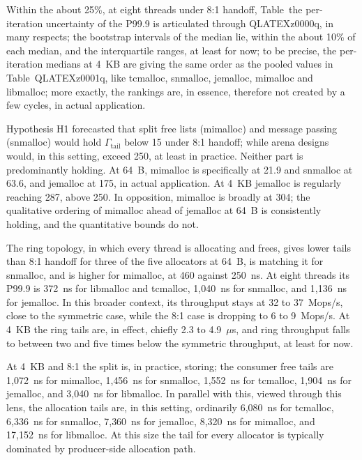 Within the about 25\%, at eight threads under 8:1 handoff, Table~the per-iteration uncertainty of the P99.9 is articulated through QLATEXz0000q, in many respects; the bootstrap intervals of the median lie, within the about 10\% of each median, and the interquartile ranges, at least for now; to be precise, the per-iteration medians at 4~KB are giving the same order as the pooled values in Table~QLATEXz0001q, like tcmalloc, snmalloc, jemalloc, mimalloc and libmalloc; more exactly, the rankings are, in essence, therefore not created by a few cycles, in actual application.









Hypothesis H1 forecasted that split free lists (mimalloc) and message passing (snmalloc) would hold
$\Gamma_{\mathrm{tail}}$ below 15 under 8:1 handoff; while arena designs would, in this setting, exceed 250, at least in practice. Neither
part is predominantly holding. At 64~B, mimalloc is specifically at 21.9 and snmalloc at 63.6, and jemalloc at 175, in actual application. At 4~KB
jemalloc is regularly reaching 287, above 250. In opposition, mimalloc is broadly at 304; the qualitative ordering of mimalloc ahead
of jemalloc at 64~B is consistently holding, and the quantitative bounds do not.

The ring topology, in which every thread is allocating and frees, gives lower tails than 8:1 handoff for
three of the five allocators at 64~B, is matching it for snmalloc, and is higher for mimalloc, at
460 against 250~ns. At eight threads its P99.9 is 372~ns for libmalloc and tcmalloc, 1{,}040~ns for
snmalloc, and 1{,}136~ns for jemalloc. In this broader context, its throughput stays at 32 to 37~Mops/s, close to the
symmetric case, while the 8:1 case is dropping to 6 to 9~Mops/s. At 4~KB the ring tails are, in effect, chiefly 2.3 to
4.9~$\mu$s, and ring throughput falls to between two and five times below the symmetric throughput, at least for now.

At 4~KB and 8:1 the split is, in practice, storing; the consumer free tails are 1{,}072~ns for mimalloc,
1{,}456~ns for snmalloc, 1{,}552~ns for tcmalloc, 1{,}904~ns for jemalloc, and 3{,}040~ns for
libmalloc. In parallel with this, viewed through this lens, the allocation tails are, in this setting, ordinarily 6{,}080~ns for tcmalloc, 6{,}336~ns for snmalloc,
7{,}360~ns for jemalloc, 8{,}320~ns for mimalloc, and 17{,}152~ns for libmalloc. At this size the tail for every allocator is typically dominated by producer-side allocation path.

